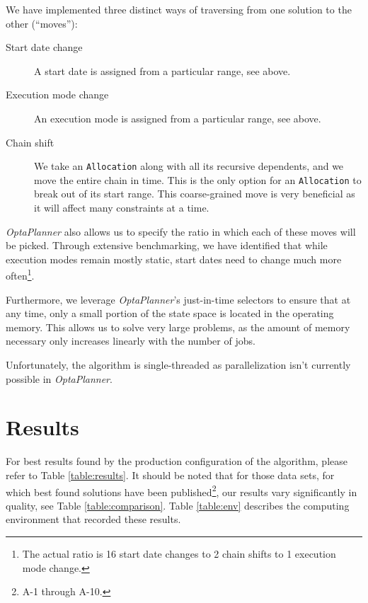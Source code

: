 \documentclass[draft]{svjour3}
\begin{document}
We have implemented three distinct ways of traversing from one solution to the other (``moves''):

\begin{description}
\item[Start date change] A start date is assigned from a particular range, see above.
\item[Execution mode change] An execution mode is assigned from a particular range, see above.
\item[Chain shift] We take an \texttt{Allocation} along with all its recursive dependents, and we move the entire chain in time. This is the only option for an \texttt{Allocation} to break out of its start range. This coarse-grained move is very beneficial as it will affect many constraints at a time.
\end{description}

\textit{OptaPlanner} also allows us to specify the ratio in which each of these moves will be picked. Through extensive benchmarking, we have identified that while execution modes remain mostly static, start dates need to change much more often\footnote{The actual ratio is 16 start date changes to 2 chain shifts to 1 execution mode change.}.

Furthermore, we leverage \textit{OptaPlanner}'s just-in-time selectors to ensure that at any time, only a small portion of the state space is located in the operating memory. This allows us to solve very large problems, as the amount of memory necessary only increases linearly with the number of jobs.

Unfortunately, the algorithm is single-threaded as parallelization isn't currently possible in \textit{OptaPlanner}.

\section{Results}

For best results found by the production configuration of the algorithm, please refer to Table \ref{table:results}. It should be noted that for those data sets, for which best found solutions have been published\footnote{A-1 through A-10.}, our results vary significantly in quality, see Table \ref{table:comparison}. Table \ref{table:env} describes the computing environment that recorded these results.
\end{document}
